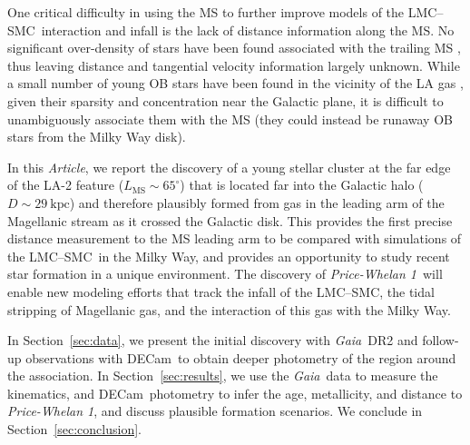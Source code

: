 \documentclass[twocolumn]{aastex62}
\newcommand{\acronym}[1]{{\small{#1}}}
\newcommand{\gaia}{\textsl{Gaia}}
\newcommand{\decam}{DECam}
\newcommand{\DR}[1]{\acronym{DR#1}}
\newcommand{\articlename}{\textsl{Article}}
\newcommand{\sectionname}{Section}
\newcommand{\clustername}{\textsl{Price-Whelan 1}}
\newcommand{\lmcsmc}{LMC--SMC}
\newcommand{\cldist}{\ensuremath{29~\textrm{kpc}}}
\begin{document}
One critical difficulty in using the MS to further improve models of the \lmcsmc\ interaction and infall is the lack of distance information along the MS.
No significant over-density of stars have been found associated with the trailing MS \citep{Guhathakurta:1998}, thus leaving distance and tangential velocity information largely unknown.
While a small number of young OB stars have been found in the vicinity of the LA gas \citep{Casetti-Dinescu:2014, Zhang:2017}, given their sparsity and concentration near the Galactic plane, it is difficult to unambiguously associate them with the MS (they could instead be runaway OB stars from the Milky Way disk).

In this \articlename, we report the discovery of a young stellar cluster at the far edge of the LA-2 feature ($L_{\textrm{MS}} \sim 65^\circ$) that is located far into the Galactic halo ($D \sim \cldist$) and therefore plausibly formed from gas in the leading arm of the Magellanic stream as it crossed the Galactic disk.
This provides the first precise distance measurement to the MS leading arm to be compared with simulations of the \lmcsmc\ in the Milky Way, and provides an opportunity to study recent star formation in a unique environment.
The discovery of \clustername\ will enable new modeling efforts that track the infall of the \lmcsmc, the tidal stripping of Magellanic gas, and the interaction of this gas with the Milky Way.

In \sectionname~\ref{sec:data}, we present the initial discovery with \gaia\ \DR{2} and follow-up observations with \decam\ to obtain deeper photometry of the region around the association.
In \sectionname~\ref{sec:results}, we use the \gaia\ data to measure the kinematics, and \decam\ photometry to infer the age, metallicity, and distance to \clustername, and discuss plausible formation scenarios.
We conclude in \sectionname~\ref{sec:conclusion}.
\end{document}
